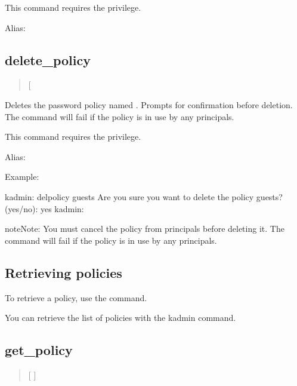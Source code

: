 \documentclass[letterpaper,10pt,english]{sphinxmanual}
\begin{document}
This command requires the  privilege.

Alias: 


\subsection{delete\_policy}
\label{\detokenize{admin/database:delete-policy}}\begin{quote}

 {[}\sphinxstylestrong{-force}{]} 
\end{quote}

Deletes the password policy named .  Prompts for confirmation
before deletion.  The command will fail if the policy is in use by any
principals.

This command requires the  privilege.

Alias: 

Example:

%
\begin{sphinxVerbatim}[commandchars=\\\{\}]
kadmin: del\PYGZus{}policy guests
Are you sure you want to delete the policy \PYGZdq{}guests\PYGZdq{}?
(yes/no): yes
kadmin:
\end{sphinxVerbatim}

\begin{sphinxadmonition}{note}{Note:}
You must cancel the policy from  principals before
deleting it.  The  command will fail if the policy
is in use by any principals.
\end{sphinxadmonition}


\subsection{Retrieving policies}
\label{\detokenize{admin/database:retrieving-policies}}
To retrieve a policy, use the {\hyperref[\detokenize{admin/admin_commands/kadmin_local:kadmin-1}]{}}  command.

You can retrieve the list of policies with the kadmin
 command.


\subsection{get\_policy}
\label{\detokenize{admin/database:get-policy}}\begin{quote}

 {[}  {]} 
\end{quote}
\end{document}
